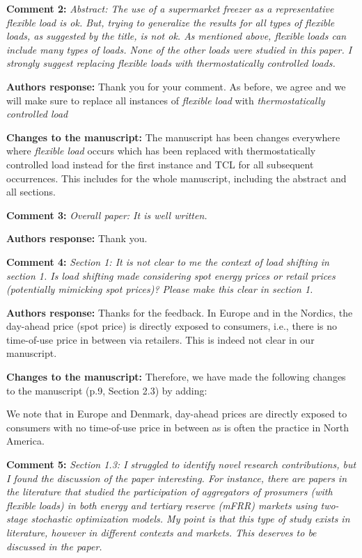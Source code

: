 \documentclass[10pt]{article}
\newcounter{models}
\newcommand{\nt}[1]{\textcolor{newtextcolor}{#1}}
\newcommand{\auth}{\textbf{Authors response: }}
\newcommand{\changes}{\textbf{Changes to the manuscript: }}
\begin{document}
\textbf{Comment 2:} \textit{Abstract: The use of a supermarket freezer as a representative flexible load is ok. But, trying to generalize the results for all types of flexible loads, as suggested by the title, is not ok. As mentioned above, flexible loads can include many types of loads. None of the other loads were studied in this paper. I strongly suggest replacing flexible loads with thermostatically controlled loads.}

\auth Thank you for your comment. As before, we agree and we will make sure to replace all instances of \textit{flexible load} with \textit{thermostatically controlled load}

\changes The manuscript has been changes everywhere where \textit{flexible load} occurs which has been replaced with \nt{thermostatically controlled load} instead for the first instance and \nt{TCL} for all subsequent occurrences. This includes for the whole manuscript, including the abstract and all sections.

\textbf{Comment 3:} \textit{Overall paper: It is well written.}

\auth Thank you.

\textbf{Comment 4:} \textit{Section 1: It is not clear to me the context of load shifting in section 1. Is load shifting made considering spot energy prices or retail prices (potentially mimicking spot prices)? Please make this clear in section 1.}

\auth Thanks for the feedback. In Europe and in the Nordics, the day-ahead price (spot price) is directly exposed to consumers, i.e., there is no time-of-use price in between via retailers. This is indeed not clear in our manuscript.

\changes Therefore, we have made the following changes to the manuscript (p.9, Section 2.3) by adding:

\nt{We note that in Europe and Denmark, day-ahead prices are directly exposed to consumers with no time-of-use price in between as is often the practice in North America.}

\textbf{Comment 5:} \textit{Section 1.3: I struggled to identify novel research contributions, but I found the discussion of the paper interesting. For instance, there are papers in the literature that studied the participation of aggregators of prosumers (with flexible loads) in both energy and tertiary reserve (mFRR) markets using two-stage stochastic optimization models. My point is that this type of study exists in literature, however in different contexts and markets. This deserves to be discussed in the paper.}
\end{document}
